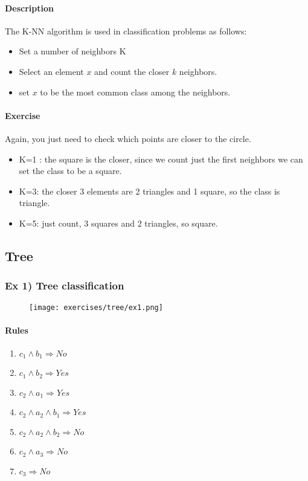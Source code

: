 \paragraph{Description}
The K-NN algorithm is used in classification problems as follows:
\begin{itemize}
\item Set a number of neighbors K
\item Select an element $x$ and count the closer $k$ neighbors.
\item set $x$ to be the most common class among the neighbors.
\end{itemize}

\paragraph{Exercise}
Again, you just need to check which points are closer to the circle. 
\begin{itemize}
\item K=1 : the square is the closer, since we count just the first neighbors we can set the class to be a square.
\item K=3: the closer 3 elements are 2 triangles and 1 square, so the class is triangle.
\item K=5: just count, 3 squares and 2 triangles, so square.
\end{itemize}





\subsection{Tree}

\subsubsection{Ex 1) Tree classification}
\begin{figure}[H]
    \centering
    \texttt{[image: exercises/tree/ex1.png]}
\end{figure}

\paragraph{Rules}
\begin{enumerate}

\item $c_1 \wedge b_1 \Rightarrow No $
\item $c_1 \wedge b_2 \Rightarrow Yes $
\item $c_2 \wedge a_1 \Rightarrow Yes $
\item $c_2 \wedge a_2 \wedge b_1 \Rightarrow Yes $
\item $c_2 \wedge a_2 \wedge b_2 \Rightarrow No $
\item $c_2 \wedge a_3 \Rightarrow No $
\item $c_3  \Rightarrow No $
\end{enumerate}

